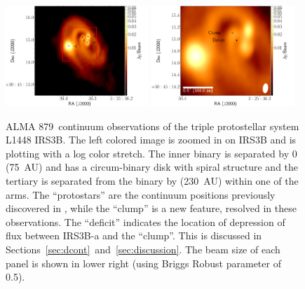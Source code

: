 \begin{figure}[H]
\begin{center}
   \includegraphics[width=0.48\textwidth]{img/L1448IRS3B_cont_robust05triplet_uc_forpos.pdf} %
   \includegraphics[width=0.48\textwidth]{img/L1448IRS3B_cont_robust05triplet_uc_positions.pdf} %
\end{center}
   \caption{ALMA 879~\micron\space continuum observations of the triple protostellar system L1448 IRS3B. The left colored image is zoomed in on IRS3B and is plotting with a log color stretch. The inner binary is separated by 0 (75~AU) and has a circum-binary disk with spiral structure and the tertiary is separated from the binary by  (230~AU) within one of the arms. The ``protostars'' are the continuum positions previously discovered in \citet{2016Natur.538..483T}, while the ``clump'' is a new feature, resolved in these observations. The ``deficit'' indicates the location of depression of flux between IRS3B-a and the ``clump''. This is discussed in Sections~\ref{sec:dcont}~and~\ref{sec:discussion}. The beam size of each panel is shown in lower right (\contbeam\space using Briggs Robust parameter of 0.5).}\label{fig:zoomincont}
\end{figure}







